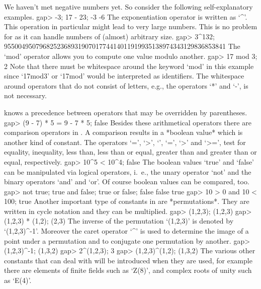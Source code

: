 We     haven't met negative numbers      yet.  So consider the  following
self-explanatory examples.
\beginexample
    gap> -3; 17 - 23;
    -3
    -6 
\endexample
The exponentiation   operator  is  written  as  `^'. This   operation  in
particular might lead  to  very large numbers.  This  is  no problem  for
{\GAP} as it can handle numbers of (almost) arbitrary size.
\beginexample
    gap> 3^132;
    955004950796825236893190701774414011919935138974343129836853841 
\endexample
The `mod' operator allows you to compute one value modulo another.
\beginexample
    gap> 17 mod 3;
    2 
\endexample
Note  that  there must be   whitespace around the  keyword  `mod' in this
example since `17mod3' or `17mod' would be interpreted as identifiers.
The whitespace around operators that do not consist of letters, e.g.,
the operators `*' and `-', is not necessary.

{\GAP}  knows a  precedence  between operators that may be overridden  by
parentheses.
\beginexample
    gap> (9 - 7) * 5 = 9 - 7  * 5;
    false 
\endexample
Besides these  arithmetical  operators there are comparison  operators in
{\GAP}. A comparison  results in a *boolean value*  which is another kind
of constant.  The operators  `=', `\<>', `\<',  `\<=', `>' and `>=', test
for equality, inequality, less than, less than or equal, greater than and
greater than or equal, respectively.
\beginexample
    gap> 10^5 < 10^4;
    false 
\endexample
The boolean values  `true' and   `false'  can be  manipulated via logical
operators, i.~e., the unary operator `not' and the binary operators `and'
and `or'.  Of course boolean values can be compared, too.
\beginexample
    gap> not true; true and false; true or false;
    false
    false
    true
    gap> 10 > 0 and 10 < 100;
    true 
\endexample
Another important  type of constants in   {\GAP} are *permutations*. They
are written in cycle notation and they can be multiplied.
\beginexample
    gap> (1,2,3);
    (1,2,3)
    gap> (1,2,3) * (1,2);
    (2,3) 
\endexample
The inverse of the   permutation  `(1,2,3)' is denoted   by `(1,2,3)^-1'.
Moreover the caret operator `^' is used to determine the image of a point
under a permutation and to conjugate one permutation by another.
\beginexample
    gap> (1,2,3)^-1;
    (1,3,2)
    gap> 2^(1,2,3);
    3
    gap> (1,2,3)^(1,2);
    (1,3,2) 
\endexample
The various other constants that {\GAP} can deal with will be introduced
when they are used, for example there are elements of finite fields
such as `Z(8)', and complex roots of unity such as `E(4)'.

